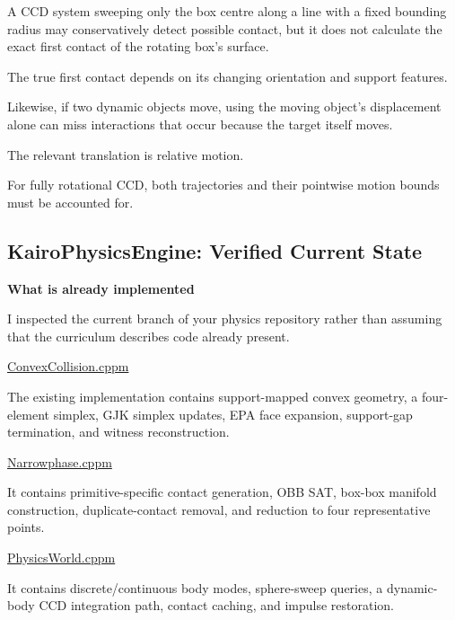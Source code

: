 A CCD system sweeping only the box centre along a line with a fixed bounding radius may conservatively detect possible contact, but it does not calculate the exact first contact of the rotating box's surface.

The true first contact depends on its changing orientation and support features.

Likewise, if two dynamic objects move, using the moving object's displacement alone can miss interactions that occur because the target itself moves.

The relevant translation is relative motion.

For fully rotational CCD, both trajectories and their pointwise motion bounds must be accounted for.

\subsection{KairoPhysicsEngine: Verified Current State}\label{04-visual-computing-ii-ch026-kairophysicsengine-verified-current-state}

\hypertarget{04-visual-computing-ii-ch026-kairophysicsengine-verified-current-state}{}

\textbf{What is already implemented}

I inspected the current  branch of your physics repository rather than assuming that the curriculum describes code already present.

\href{https://github.com/swayam8624/KairoPhysicsEngine/blob/main/ConvexCollision.cppm?utm_source=chatgpt.com}{ConvexCollision.cppm}

The existing implementation contains support-mapped convex geometry, a four-element simplex, GJK simplex updates, EPA face expansion, support-gap termination, and witness reconstruction.

\href{https://github.com/swayam8624/KairoPhysicsEngine/blob/main/Narrowphase.cppm?utm_source=chatgpt.com}{Narrowphase.cppm}

It contains primitive-specific contact generation, OBB SAT, box-box manifold construction, duplicate-contact removal, and reduction to four representative points.

\href{https://github.com/swayam8624/KairoPhysicsEngine/blob/main/PhysicsWorld.cppm?utm_source=chatgpt.com}{PhysicsWorld.cppm}

It contains discrete/continuous body modes, sphere-sweep queries, a dynamic-body CCD integration path, contact caching, and impulse restoration.

